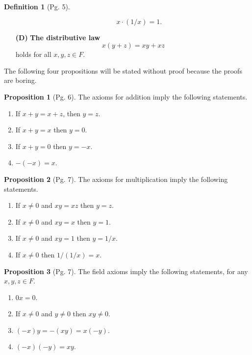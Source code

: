 \documentclass[leqno]{article}
\theoremstyle{definition}
\newtheorem{prop}{Proposition}[section]
\newtheorem{definition}{Definition}[section]
\theoremstyle{remark}
\begin{document}
\begin{definition}[Pg. 5]
\begin{enumerate}
\begin{enumerate}
                                \begin{equation*}
                                    x\cdot(1/x)=1.
                                \end{equation*}
                        \end{enumerate}
                    \item[\textbf{(D)}] \textbf{The distributive law}
                        \begin{equation*}
                            x(y+z)=xy+xz
                        \end{equation*}
                        holds for all $x,y,z\in F$. \cite{rud}
                \end{enumerate}
        \end{definition}
        The following four propositions will be stated without proof because the proofs are boring.
        \begin{prop}[Pg. 6]\label{prop:2.1}
            The axioms for addition imply the following statements.
                \begin{enumerate}[label=(\alph*)]
                    \item If $x+y=x+z$, then $y=z$.
                    \item If $x+y=x$ then $y=0$.
                    \item If $x+y=0$ then $y=-x$.
                    \item $-(-x)=x$. \cite{rud}
                \end{enumerate}
        \end{prop}
        \begin{prop}[Pg. 7]\label{prop:2.2}
            The axioms for multiplication imply the following statements.
                \begin{enumerate}[label=(\alph*)]
                    \item If $x\neq 0$ and $xy=xz$ then $y=z$.
                    \item If $x\neq 0$ and $xy=x$ then $y=1$.
                    \item If $x\neq 0$ and $xy=1$ then $y=1/x$.
                    \item If $x\neq 0$ then $1/(1/x)=x$. \cite{rud}
                \end{enumerate}
        \end{prop}
        \begin{prop}[Pg. 7]\label{prop:2.3}
            The field axioms imply the following statements, for any $x,y,z\in F$.
                \begin{enumerate}[label=(\alph*)]
                    \item $0x=0$.
                    \item If $x\neq 0$ and $y\neq 0$ then $xy\neq 0$.
                    \item $(-x)y=-(xy)=x(-y)$.
                    \item $(-x)(-y)=xy$. \cite{rud}
                \end{enumerate}
        \end{prop}
\end{document}
